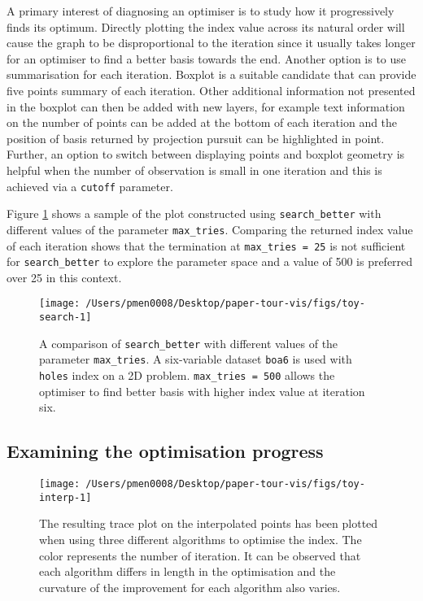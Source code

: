 \documentclass[12pt]{article}
\begin{document}
A primary interest of diagnosing an optimiser is to study how it progressively finds its optimum. Directly plotting the index value across its natural order will cause the graph to be disproportional to the iteration since it usually takes longer for an optimiser to find a better basis towards the end. Another option is to use summarisation for each iteration. Boxplot is a suitable candidate that can provide five points summary of each iteration. Other additional information not presented in the boxplot can then be added with new layers, for example text information on the number of points can be added at the bottom of each iteration and the position of basis returned by projection pursuit can be highlighted in point. Further, an option to switch between displaying points and boxplot geometry is helpful when the number of observation is small in one iteration and this is achieved via a \texttt{cutoff} parameter.

Figure \ref{fig:toy-search} shows a sample of the plot constructed using \texttt{search\_better} with different values of the parameter \texttt{max\_tries}. Comparing the returned index value of each iteration shows that the termination at \texttt{max\_tries\ =\ 25} is not sufficient for \texttt{search\_better} to explore the parameter space and a value of 500 is preferred over 25 in this context.

\begin{figure}

{\centering \texttt{[image: /Users/pmen0008/Desktop/paper-tour-vis/figs/toy-search-1]} 

}

\caption{A comparison of \texttt{search\_better} with different values of the parameter \texttt{max\_tries}. A six-variable dataset \texttt{boa6} is used with \texttt{holes} index on a 2D problem. \texttt{max\_tries\ =\ 500} allows the optimiser to find better basis with higher index value at iteration six.}\label{fig:toy-search}
\end{figure}



\hypertarget{toy-interp}{%
\subsection{Examining the optimisation progress}\label{toy-interp}}

\begin{figure}

{\centering \texttt{[image: /Users/pmen0008/Desktop/paper-tour-vis/figs/toy-interp-1]} 

}

\caption{The resulting trace plot on the interpolated points has been plotted when using three different algorithms to optimise the index. The color represents the number of iteration. It can be observed that each algorithm differs in length in the optimisation and the curvature of the improvement for each algorithm also varies.}\label{fig:toy-interp}
\end{figure}
\end{document}
